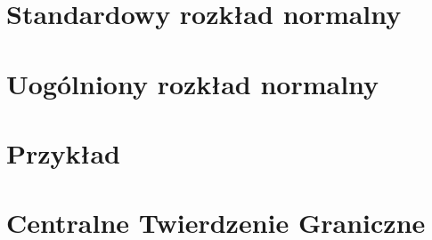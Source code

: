 \section{Standardowy rozkład normalny}


\newpage
\section{Uogólniony rozkład normalny}


\newpage
\section{Przykład}


\newpage
\section{Centralne Twierdzenie Graniczne}

